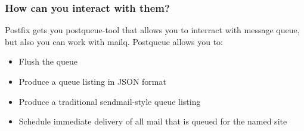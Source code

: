 \documentclass[a4paper,11pt]{article}
\begin{document}
\subsubsection{How can you interact with them?}
Postfix gets you postqueue-tool that allows you to interract with message queue, but also you can work with mailq. Postqueue allows you to:

\begin{itemize}
    \item Flush the queue
    \item Produce a queue listing in JSON format
    \item Produce a traditional sendmail-style queue listing
    \item Schedule immediate delivery of all mail that is queued  for  the named  site
\end{itemize}
\end{document}
